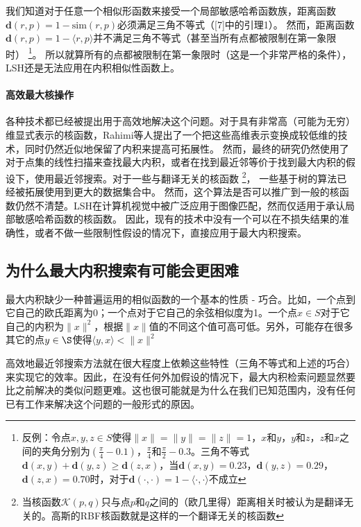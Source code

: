 \documentclass[twocolumn]{article}
\begin{document}
我们知道对于任意一个相似形函数来接受一个局部敏感哈希函数族，距离函数$\mathbf{d}(r,p) = 1 - \mathrm{sim}(r,p)$必须满足三角不等式（[7]中的引理1）。
然而，距离函数$\mathbf{d}(r, p) = 1 - \langle r,p \rangle$并不满足三角不等式（甚至当所有点都被限制在第一象限时）
\footnote{反例：令点$x,y,z\in S$使得$\|x\|=\|y\|=\|z\|=1$，$x$和$y$，$y$和$z$，$z$和$x$之间的夹角分别为$\left(\frac{\pi}{4} - 0.1\right)$，$\frac{\pi}{4}$和$\frac{\pi}{2} - 0.3$。三角不等式$\mathbf{d}(x,y)+\mathbf{d}(y,z)\ge\mathbf{d}(z,x)$，当$\mathbf{d}(x,y) = 0.23$，$\mathbf{d}(y,z)=0.29$，$\mathbf{d}(z,x)=0.70$时，对于$\mathbf{d}(\cdot,\cdot)=1-\langle \cdot,\cdot \rangle$不成立}。
所以就算所有的点都被限制在第一象限时（这是一个非常严格的条件），LSH还是无法应用在内积相似性函数上。

\paragraph{高效最大核操作}各种技术都已经被提出用于高效地解决这个问题。对于具有非常高（可能为无穷）维显式表示的核函数，Rahimi等人提出了一个把这些高维表示变换成较低维的技术，同时仍然近似地保留了内积来提高可拓展性。
然而，最终的研究仍然使用了对于点集的线性扫描来查找最大内积，或者在找到最近邻等价于找到最大内积的假设下，使用最近邻搜索。对于一些与翻译无关的核函数
\footnote{当核函数$\mathcal{K}(p,q)$只与点$p$和$q$之间的（欧几里得）距离相关时被认为是翻译无关的。高斯的RBF核函数就是这样的一个翻译无关的核函数}，
一些基于树的算法已经被拓展使用到更大的数据集合中。
然而，这个算法是否可以推广到一般的核函数仍然不清楚。LSH在计算机视觉中被广泛应用于图像匹配，然而仅适用于承认局部敏感哈希函数的核函数。
因此，现有的技术中没有一个可以在不损失结果的准确性，或者不做一些限制性假设的情况下，直接应用于最大内积搜索。

\subsection{为什么最大内积搜索有可能会更困难}

最大内积缺少一种普遍运用的相似函数的一个基本的性质 - 巧合。比如，一个点到它自己的欧氏距离为0；一个点对于它自己的余弦相似度为1。一个点$x \in S$对于它自己的内积为$\|x\|^2$，根据$\|x\|$值的不同这个值可高可低。另外，可能存在很多其它的点$y \in \S$使得$\langle y,x \rangle < \|x\|^2$

高效地最近邻搜索方法就在很大程度上依赖这些特性（三角不等式和上述的巧合）来实现它的效率。因此，在没有任何外加假设的情况下，最大内积检索问题显然要比之前解决的类似问题更难。这也很可能就是为什么在我们已知范围内，没有任何已有工作来解决这个问题的一般形式的原因。
\end{document}
